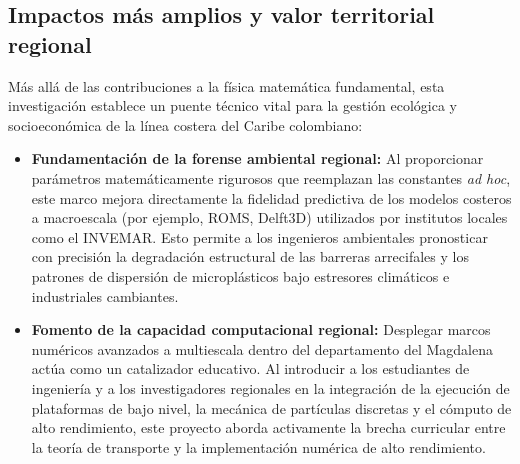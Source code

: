 \subsection{Impactos más amplios y valor territorial regional}
Más allá de las contribuciones a la física matemática fundamental, esta investigación establece un puente técnico vital para la gestión ecológica y socioeconómica de la línea costera del Caribe colombiano:
\begin{itemize}
    \item \textbf{Fundamentación de la forense ambiental regional:} Al proporcionar parámetros matemáticamente rigurosos que reemplazan las constantes \emph{ad hoc}, este marco mejora directamente la fidelidad predictiva de los modelos costeros a macroescala (por ejemplo, ROMS, Delft3D) utilizados por institutos locales como el INVEMAR. Esto permite a los ingenieros ambientales pronosticar con precisión la degradación estructural de las barreras arrecifales y los patrones de dispersión de microplásticos bajo estresores climáticos e industriales cambiantes.
    \item \textbf{Fomento de la capacidad computacional regional:} Desplegar marcos numéricos avanzados a multiescala dentro del departamento del Magdalena actúa como un catalizador educativo. Al introducir a los estudiantes de ingeniería y a los investigadores regionales en la integración de la ejecución de plataformas de bajo nivel, la mecánica de partículas discretas y el cómputo de alto rendimiento, este proyecto aborda activamente la brecha curricular entre la teoría de transporte y la implementación numérica de alto rendimiento.

\end{itemize}
